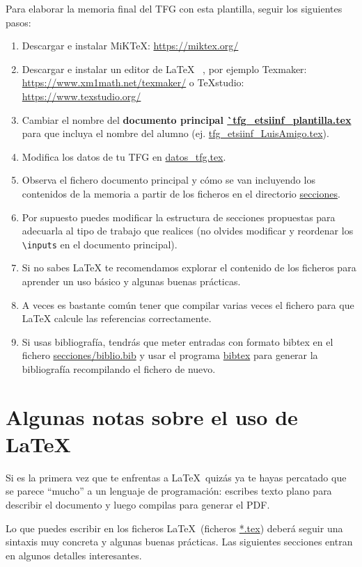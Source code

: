 Para elaborar la memoria final del TFG con esta plantilla, seguir los siguientes pasos:
\begin{enumerate}
\item Descargar e instalar MiKTeX:  \url{https://miktex.org/}
\item Descargar e instalar un editor de \LaTeX~ , por ejemplo Texmaker:
\url{https://www.xm1math.net/texmaker/} o TeXstudio: \url{https://www.texstudio.org/}
\item Cambiar el nombre del \textbf{documento principal
    \url{`tfg_etsiinf_plantilla.tex}} para que incluya el nombre del
  alumno (ej. \url{tfg_etsiinf_LuisAmigo.tex}).
\item Modifica los datos de tu TFG en \url{datos_tfg.tex}.
\item Observa el fichero documento principal y cómo se van incluyendo
  los contenidos de la memoria a partir de los ficheros en el
  directorio \url{secciones}.
\item Por supuesto puedes modificar la estructura de secciones
  propuestas para adecuarla al tipo de trabajo que realices (no
  olvides modificar y reordenar los \verb|\inputs| en el documento
  principal).
\item Si no sabes LaTeX te recomendamos explorar el contenido de los
  ficheros para aprender un uso básico y algunas buenas prácticas.
\item A veces es bastante común tener que compilar varias veces el
  fichero para que LaTeX calcule las referencias correctamente.
\item Si usas bibliografía, tendrás que meter entradas con formato
  bibtex en el fichero \url{secciones/biblio.bib} y usar el programa
  \url{bibtex} para generar la bibliografía recompilando el fichero de
  nuevo.
\end{enumerate}

\section{Algunas notas sobre el uso de \LaTeX}
\label{sec:latex}

Si es la primera vez que te enfrentas a \LaTeX\ quizás ya te hayas
percatado que se parece ``mucho'' a un lenguaje de programación:
escribes texto plano para describir el documento y luego compilas para
generar el PDF.

Lo que puedes escribir en los ficheros \LaTeX\ (ficheros \url{*.tex})
deberá seguir una sintaxis muy concreta y algunas buenas
prácticas. Las siguientes secciones entran en algunos detalles
interesantes.

